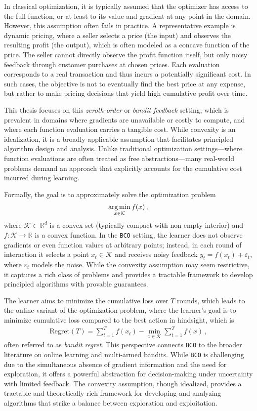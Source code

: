\documentclass[letter, 12pt]{report}
\newcommand{\argmin}{\operatornamewithlimits{arg\,min}}
\newcommand{\cK}{\mathcal K}
\newcommand{\1}{\mathbf{1}}
\newcommand{\bco}{\texttt{BCO}\xspace}
\theoremstyle{plain}
\theoremstyle{definition}
\theoremstyle{remark}
\begin{document}
In classical optimization, it is typically assumed that the optimizer has access to the full function, or at least to its value and gradient at any point in the domain. However, this assumption often fails in practice. A representative example is dynamic pricing, where a seller selects a price (the input) and observes the resulting profit (the output), which is often modeled as a concave function of the price. The seller cannot directly observe the profit function itself, but only noisy feedback through customer purchases at chosen prices. Each evaluation corresponds to a real transaction and thus incurs a potentially significant cost. In such cases, the objective is not to eventually find the best price at any expense, but rather to make pricing decisions that yield high cumulative profit over time.

This thesis focuses on this \emph{zeroth-order} or \emph{bandit feedback} setting, which is prevalent in domains where gradients are unavailable or costly to compute, and where each function evaluation carries a tangible cost. While convexity is an idealization, it is a broadly applicable assumption that facilitates principled algorithm design and analysis. Unlike traditional optimization settings—where function evaluations are often treated as free abstractions—many real-world problems demand an approach that explicitly accounts for the cumulative cost incurred during learning.

Formally, the goal is to approximately solve the optimization problem
\begin{align}
    \argmin_{x \in \cK} f(x)\,,
\end{align}
where \( \cK \subset \mathbb{R}^d \) is a convex set (typically compact with non-empty interior) and \( f : \cK \to \mathbb{R} \) is a convex function.
In the \bco setting, the learner does not observe gradients or even function values at arbitrary points;
instead, in each round of interaction it selects a point \( x_t \in \cK \) and receives noisy feedback \( y_t = f(x_t) + \varepsilon_t \), where \( \varepsilon_t \) models the noise.
While the convexity assumption may seem restrictive, it captures a rich class of problems and provides a tractable framework to develop principled algorithms with provable guarantees.

The learner aims to minimize the cumulative loss over \( T \) rounds,
which leads to the online variant of the optimization problem, where the learner’s goal is to minimize
cumulative loss compared to the best action in hindsight, which is
\begin{align}
    \text{Regret}(T) = \sum_{t=1}^T f(x_t) - \min_{x \in \cK} \sum_{t=1}^T f(x)\,,
\end{align}
often referred to as \emph{bandit regret}. This perspective connects \bco to the broader literature on online learning and multi-armed bandits. While \bco is challenging due to the simultaneous absence of gradient information and the need for exploration, it offers a powerful abstraction for decision-making under uncertainty with limited feedback. The convexity assumption, though idealized, provides a tractable and theoretically rich framework for developing and analyzing algorithms that strike a balance between exploration and exploitation.
\end{document}
